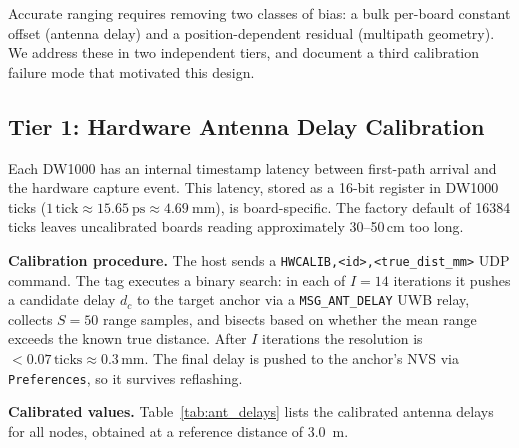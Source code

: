 
Accurate ranging requires removing two classes of bias:
a bulk per-board constant offset (antenna delay) and a
position-dependent residual (multipath geometry).
We address these in two independent tiers, and document a third calibration
failure mode that motivated this design.

\subsection{Tier 1: Hardware Antenna Delay Calibration}

Each DW1000 has an internal timestamp latency between first-path arrival and
the hardware capture event.
This latency, stored as a 16-bit register in DW1000 ticks
($1\,\text{tick} \approx \SI{15.65}{\pico\second} \approx \SI{4.69}{\milli\metre}$),
is board-specific.
The factory default of 16384 ticks leaves uncalibrated boards reading
approximately 30--50\,cm too long.

\textbf{Calibration procedure.}
The host sends a \texttt{HWCALIB,<id>,<true\_dist\_mm>} UDP command.
The tag executes a binary search: in each of $I = 14$ iterations it pushes
a candidate delay $d_c$ to the target anchor via a \texttt{MSG\_ANT\_DELAY}
UWB relay, collects $S = 50$ range samples, and bisects based on whether the
mean range exceeds the known true distance.
After $I$ iterations the resolution is $< 0.07\,\text{ticks} \approx 0.3$\,mm.
The final delay is pushed to the anchor's NVS via \texttt{Preferences}, so
it survives reflashing.

\textbf{Calibrated values.}
Table~\ref{tab:ant_delays} lists the calibrated antenna delays for all nodes,
obtained at a reference distance of \SI{3.0}{\metre}.

